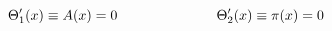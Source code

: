 \begin{equation}
   \Theta'_1(x)\equiv A(x)=0 \hspace{2.5cm} \Theta'_2(x)\equiv\pi(x)=0
  \label{a44}
  \end{equation}

